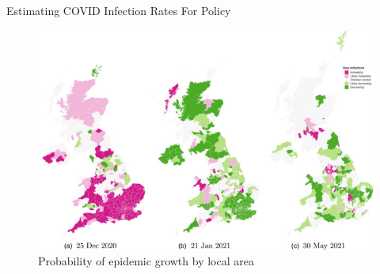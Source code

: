 \documentclass[dvipsnames]{beamer}
\begin{document}

\begin{frame}{Estimating COVID Infection Rates For Policy}
\begin{figure}
\centerline{\includegraphics[scale=.5]{img/covid_uk.jpg}}
\caption{Probability of epidemic growth by local area}
\label{fig-covid}
\end{figure}
\end{frame}
\end{document}
